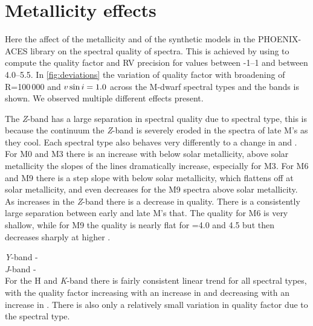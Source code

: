 \section{Metallicity \Logg{} effects}
Here the affect of the metallicity and \Logg{} of the synthetic models in the {PHOENIX-ACES} library on the spectral quality of spectra.
This is achieved by using \eniric{} to compute the quality factor and RV precision for  \feh{} values between -1--1 and \Logg{} between 4.0--5.5.
In \cref{fig:deviations} the variation of quality factor with broadening of R=100\,000 and $v\sin{i}=1.0$\kmps{} across the {M-dwarf} spectral types and the \nir{} bands is shown.
We observed multiple different effects present.


The \emph{Z}-band has a large separation in spectral quality due to spectral type, this is because the continuum the \emph{Z}-band is severely eroded in the spectra of late M's as they cool.
Each spectral type also behaves very differently to a change in \feh{} and \Logg{}.
For {M0} and {M3} there is an increase with \feh{} below solar metallicity, above solar metallicity the slopes of the lines dramatically increase, especially for {M3}.
For {M6} and {M9} there is a step slope with \feh{} below solar metallicity, which flattens off at solar metallicity, and even decreases for the {M9} spectra above solar metallicity.
As \Logg{} increases in the \emph{Z}-band there is a decrease in quality.
There is a consistently large separation between early and late M's that.
The quality for {M6} is very shallow, while for {M9} the quality is nearly flat for \Logg{}=4.0 and 4.5 but then decreases sharply at higher \Logg{}.

\emph{Y}-band -\\

\emph{J}-band - \\

For the H and \emph{K}-band there is fairly consistent linear trend for all spectral types, with the quality factor increasing with an increase in \feh{} and decreasing with an increase in \Logg{}.
There is also only a relatively small variation in quality factor due to the spectral type.



